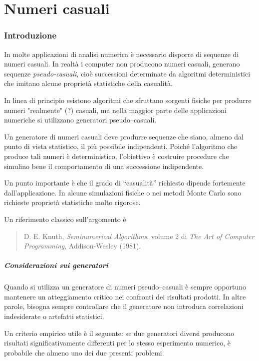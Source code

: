 \chapter{Numeri casuali}

\subsection{Introduzione}

In molte applicazioni di analisi numerica è necessario disporre di sequenze di numeri casuali. In realtà i computer non producono numeri casuali, generano sequenze \emph{pseudo-casuali}, cioè successioni determinate da algoritmi deterministici che imitano alcune proprietà statistiche della casualità.

In linea di principio esistono algoritmi che sfruttano sorgenti fisiche per produrre numeri "realmente" (?) casuali, ma nella maggior parte delle applicazioni numeriche si utilizzano generatori pseudo–casuali.

Un generatore di numeri casuali deve produrre sequenze che siano, almeno dal punto di vista statistico, il più possibile indipendenti. Poiché l'algoritmo che produce tali numeri è deterministico, l'obiettivo è costruire procedure che simulino bene il comportamento di una successione indipendente.

Un punto importante è che il grado di ``casualità'' richiesto dipende fortemente dall'applicazione. In alcune simulazioni fisiche o nei metodi Monte Carlo sono richieste proprietà statistiche molto rigorose.

Un riferimento classico sull'argomento è

\begin{quote}
	D. E. Knuth, \emph{Seminumerical Algorithms}, volume 2 di \emph{The Art of Computer Programming}, Addison-Wesley (1981).
\end{quote}

\paragraph*{Considerazioni sui generatori}
Quando si utilizza un generatore di numeri pseudo–casuali è sempre opportuno mantenere un atteggiamento critico nei confronti dei risultati prodotti. In altre parole, bisogna sempre controllare che il generatore non introduca correlazioni indesiderate o artefatti statistici.

Un criterio empirico utile è il seguente: se due generatori diversi producono risultati significativamente differenti per lo stesso esperimento numerico, è probabile che almeno uno dei due presenti problemi.

